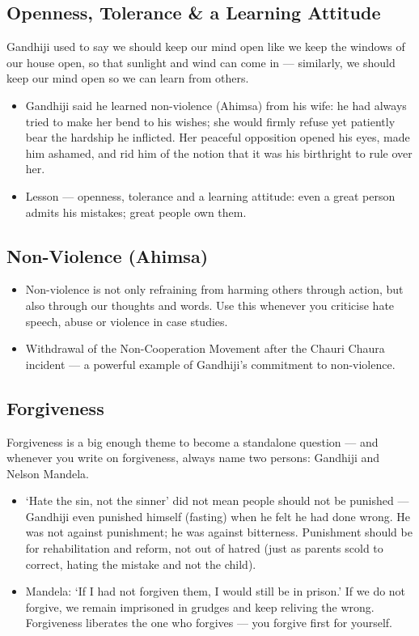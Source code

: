 \subsection{Openness, Tolerance \& a Learning Attitude}

Gandhiji used to say we should keep our mind open like we keep the windows of our house open, so that sunlight and wind can come in --- similarly, we should keep our mind open so we can learn from others.

\begin{KeyConcept}
\begin{itemize}
\item Gandhiji said he learned non-violence (Ahimsa) from his wife: he had always tried to make her bend to his wishes; she would firmly refuse yet patiently bear the hardship he inflicted. Her peaceful opposition opened his eyes, made him ashamed, and rid him of the notion that it was his birthright to rule over her.
\item Lesson --- openness, tolerance and a learning attitude: even a great person admits his mistakes; great people own them.
\end{itemize}
\end{KeyConcept}

\subsection{Non-Violence (Ahimsa)}

\begin{itemize}
\item Non-violence is not only refraining from harming others through action, but also through our thoughts and words. Use this whenever you criticise hate speech, abuse or violence in case studies.
\item Withdrawal of the Non-Cooperation Movement after the Chauri Chaura incident --- a powerful example of Gandhiji's commitment to non-violence.
\end{itemize}

\subsection{Forgiveness}

Forgiveness is a big enough theme to become a standalone question --- and whenever you write on forgiveness, always name two persons: Gandhiji and Nelson Mandela.

\begin{itemize}
\item `Hate the sin, not the sinner' did not mean people should not be punished --- Gandhiji even punished himself (fasting) when he felt he had done wrong. He was not against punishment; he was against bitterness. Punishment should be for rehabilitation and reform, not out of hatred (just as parents scold to correct, hating the mistake and not the child).
\item Mandela: `If I had not forgiven them, I would still be in prison.' If we do not forgive, we remain imprisoned in grudges and keep reliving the wrong. Forgiveness liberates the one who forgives --- you forgive first for yourself.
\end{itemize}

